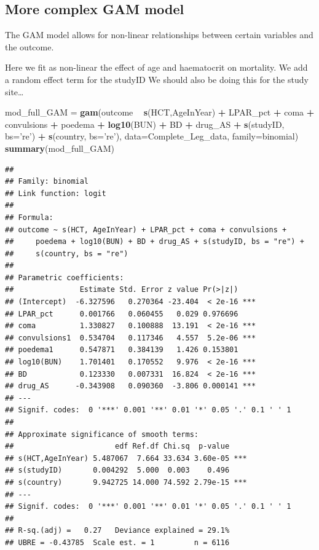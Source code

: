 \documentclass[]{article}
\newenvironment{Shaded}{\begin{snugshade}}{\end{snugshade}}
\newcommand{\KeywordTok}[1]{\textcolor[rgb]{0.13,0.29,0.53}{\textbf{#1}}}
\newcommand{\DataTypeTok}[1]{\textcolor[rgb]{0.13,0.29,0.53}{#1}}
\newcommand{\StringTok}[1]{\textcolor[rgb]{0.31,0.60,0.02}{#1}}
\newcommand{\OperatorTok}[1]{\textcolor[rgb]{0.81,0.36,0.00}{\textbf{#1}}}
\newcommand{\NormalTok}[1]{#1}
\begin{document}
\subsection{More complex GAM model}\label{more-complex-gam-model}

The GAM model allows for non-linear relationships between certain
variables and the outcome.

Here we fit as non-linear the effect of age and haematocrit on
mortality. We add a random effect term for the studyID We should also be
doing this for the study site\ldots{}

\begin{Shaded}
\begin{Highlighting}[]
\NormalTok{mod_full_GAM =}\StringTok{ }\KeywordTok{gam}\NormalTok{(outcome }\OperatorTok{~}\StringTok{ }\KeywordTok{s}\NormalTok{(HCT,AgeInYear) }\OperatorTok{+}\StringTok{ }\NormalTok{LPAR_pct  }\OperatorTok{+}\StringTok{ }\NormalTok{coma }\OperatorTok{+}\StringTok{ }\NormalTok{convulsions }\OperatorTok{+}
\StringTok{                     }\NormalTok{poedema }\OperatorTok{+}\StringTok{ }\KeywordTok{log10}\NormalTok{(BUN) }\OperatorTok{+}\StringTok{ }\NormalTok{BD }\OperatorTok{+}\StringTok{ }\NormalTok{drug_AS }\OperatorTok{+}\StringTok{ }
\StringTok{                     }\KeywordTok{s}\NormalTok{(studyID, }\DataTypeTok{bs=}\StringTok{'re'}\NormalTok{) }\OperatorTok{+}\StringTok{ }\KeywordTok{s}\NormalTok{(country, }\DataTypeTok{bs=}\StringTok{'re'}\NormalTok{),}
                   \DataTypeTok{data=}\NormalTok{Complete_Leg_data, }\DataTypeTok{family=}\NormalTok{binomial)}
\KeywordTok{summary}\NormalTok{(mod_full_GAM)}
\end{Highlighting}
\end{Shaded}

\begin{verbatim}
## 
## Family: binomial 
## Link function: logit 
## 
## Formula:
## outcome ~ s(HCT, AgeInYear) + LPAR_pct + coma + convulsions + 
##     poedema + log10(BUN) + BD + drug_AS + s(studyID, bs = "re") + 
##     s(country, bs = "re")
## 
## Parametric coefficients:
##               Estimate Std. Error z value Pr(>|z|)    
## (Intercept)  -6.327596   0.270364 -23.404  < 2e-16 ***
## LPAR_pct      0.001766   0.060455   0.029 0.976696    
## coma          1.330827   0.100888  13.191  < 2e-16 ***
## convulsions1  0.534704   0.117346   4.557  5.2e-06 ***
## poedema1      0.547871   0.384139   1.426 0.153801    
## log10(BUN)    1.701401   0.170552   9.976  < 2e-16 ***
## BD            0.123330   0.007331  16.824  < 2e-16 ***
## drug_AS      -0.343908   0.090360  -3.806 0.000141 ***
## ---
## Signif. codes:  0 '***' 0.001 '**' 0.01 '*' 0.05 '.' 0.1 ' ' 1
## 
## Approximate significance of smooth terms:
##                       edf Ref.df Chi.sq  p-value    
## s(HCT,AgeInYear) 5.487067  7.664 33.634 3.60e-05 ***
## s(studyID)       0.004292  5.000  0.003    0.496    
## s(country)       9.942725 14.000 74.592 2.79e-15 ***
## ---
## Signif. codes:  0 '***' 0.001 '**' 0.01 '*' 0.05 '.' 0.1 ' ' 1
## 
## R-sq.(adj) =   0.27   Deviance explained = 29.1%
## UBRE = -0.43785  Scale est. = 1         n = 6116
\end{verbatim}
\end{document}
